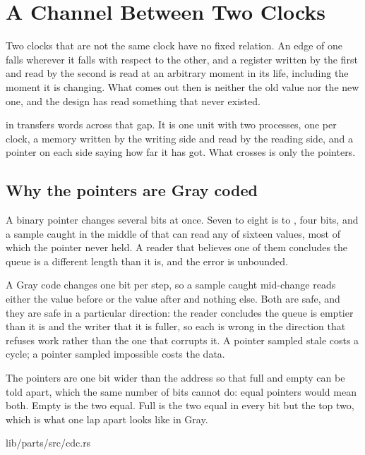 \section{A Channel Between Two Clocks}
\label{sec:x-cdc}

Two clocks that are not the same clock have no fixed relation. An
edge of one falls wherever it falls with respect to the other, and a
register written by the first and read by the second is read at an
arbitrary moment in its life, including the moment it is changing.
What comes out then is neither the old value nor the new one, and the
design has read something that never existed.

 in  transfers words across that gap.
It is one unit with two processes, one per clock, a memory written by
the writing side and read by the reading side, and a pointer on each
side saying how far it has got. What crosses is only the pointers.

\subsection{Why the pointers are Gray coded}

A binary pointer changes several bits at once. Seven to eight is
 to , four bits, and a sample caught in the
middle of that can read any of sixteen values, most of which the
pointer never held. A reader that believes one of them concludes the
queue is a different length than it is, and the error is unbounded.

A Gray code changes one bit per step, so a sample caught mid-change
reads either the value before or the value after and nothing else.
Both are safe, and they are safe in a particular direction: the
reader concludes the queue is emptier than it is and the writer that
it is fuller, so each is wrong in the direction that refuses work
rather than the one that corrupts it. A pointer sampled stale costs a
cycle; a pointer sampled impossible costs the data.

The pointers are one bit wider than the address so that full and
empty can be told apart, which the same number of bits cannot do:
equal pointers would mean both. Empty is the two equal. Full is the
two equal in every bit but the top two, which is what one lap apart
looks like in Gray.

%
{lib/parts/src/cdc.rs}

